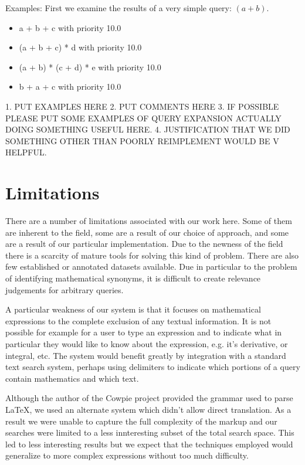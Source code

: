 \documentclass{sig-alternate}
\begin{document}
Examples:
First we examine the results of a very simple query: $(a+b)$.
\begin{itemize}
    \item a + b + c  with priority  10.0
    \item (a + b + c) * d  with priority  10.0
    \item (a + b) * (c + d) * e  with priority  10.0
    \item b + a + c  with priority  10.0
\end{itemize}



1. PUT EXAMPLES HERE
2. PUT COMMENTS HERE
3. IF POSSIBLE PLEASE PUT SOME EXAMPLES OF QUERY EXPANSION ACTUALLY DOING SOMETHING USEFUL HERE.
4. JUSTIFICATION THAT WE DID SOMETHING OTHER THAN POORLY REIMPLEMENT WOULD BE V HELPFUL.

\section{Limitations}
There are a number of limitations associated with our work here. Some of them are inherent to the field,
some are a result of our choice of approach, and some are a result of our particular implementation. Due to the newness
of the field there is a scarcity of mature tools for solving this kind of problem. There are also few 
established or annotated datasets available. Due in particular to the problem of identifying mathematical
synonyms, it is difficult to create relevance judgements for arbitrary queries. 

A particular weakness of our system is that it focuses on mathematical expressions to the complete exclusion
of any textual information. It is not possible for example for a user to type an expression and to indicate what
in particular they would like to know about the expression, e.g. it's derivative, or integral, etc. The system would benefit greatly by integration with a standard text search system, perhaps using delimiters to indicate which portions
of a query contain mathematics and which text.

Although the author of the Cowpie project provided the grammar used to parse \LaTeX, we used an alternate system
which didn't allow direct translation. As a result we were unable to capture the full complexity of the markup and 
our searches were limited to a less innteresting subset of the total search space. This led to less interesting results
but we expect that the techniques employed would generalize to more complex expressions without too much difficulty.
\end{document}
